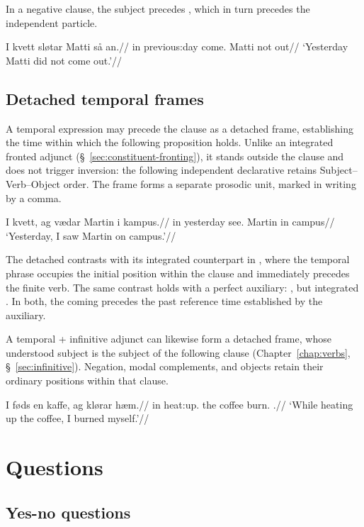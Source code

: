 In a negative clause, the subject precedes , which in turn precedes the independent particle.

\pex
\begingl
\gla I kvett sløtar Matti så an.//
\glb in previous:day come.\Pst{} Matti not out//
\glft `Yesterday Matti did not come out.'//
\endgl
\xe


\subsection{Detached temporal frames}
\label{sec:detached-temporal-frames}

A temporal expression may precede the clause as a detached frame, establishing the time within which the following proposition holds. Unlike an integrated fronted adjunct (\S~\ref{sec:constituent-fronting}), it stands outside the clause and does not trigger inversion: the following independent declarative retains Subject--Verb--Object order. The frame forms a separate prosodic unit, marked in writing by a comma.

\pex
\begingl
\gla I kvett, ag vædar Martin i kampus.//
\glb in yesterday \First{}\Sg{} see.\Pst{} Martin in campus//
\glft `Yesterday, I saw Martin on campus.'//
\endgl
\xe

The detached  contrasts with its integrated counterpart in , where the temporal phrase occupies the initial position within the clause and immediately precedes the finite verb. The same contrast holds with a perfect auxiliary: , but integrated . In both, the coming precedes the past reference time established by the auxiliary.

A temporal  + infinitive adjunct can likewise form a detached frame, whose understood subject is the subject of the following clause (Chapter~\ref{chap:verbs}, \S~\ref{sec:infinitive}). Negation, modal complements, and objects retain their ordinary positions within that clause.

\pex
\begingl
\gla I føds en kaffe, ag klørar hæm.//
\glb in heat:up.\Inf{} the coffee \First{}\Sg{} burn.\Pst{} \Refl{}.\Acc{}//
\glft `While heating up the coffee, I burned myself.'//
\endgl
\xe


\section{Questions}

\subsection{Yes-no questions}
\label{sec:yes-no-questions}

